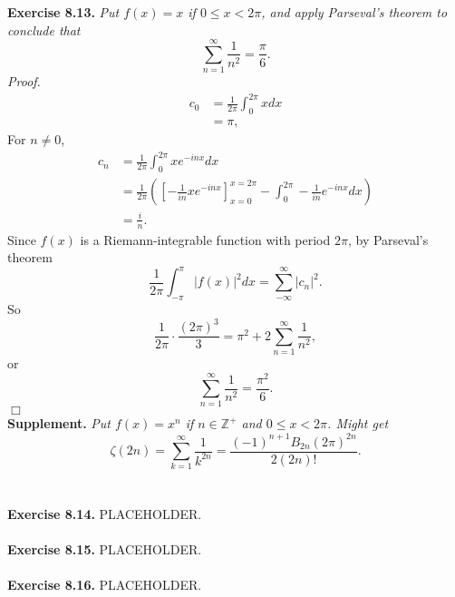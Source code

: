 \documentclass{article}
\begin{document}
\textbf{Exercise 8.13.}
\emph{Put $f(x) = x$ if $0 \leq x < 2 \pi$, and apply Parseval's theorem to conclude that
$$\sum_{n = 1}^{\infty} \frac{1}{n^2} = \frac{\pi}{6}.$$}
\emph{Proof.}
\begin{align*}
c_0
&= \frac{1}{2 \pi} \int_{0}^{2 \pi} x dx \\
&= \pi,
\end{align*}
For $n \neq 0$,
\begin{align*}
c_n
&= \frac{1}{2 \pi} \int_{0}^{2 \pi} x e^{-inx} dx \\
&= \frac{1}{2 \pi} \left(
\left[ - \frac{1}{i n} x e^{-inx} \right]_{x = 0}^{x = 2 \pi}
- \int_{0}^{2 \pi} - \frac{1}{i n} e^{-inx} dx \right) \\
&= \frac{i}{n}.
\end{align*}
Since $f(x)$ is a Riemann-integrable function with period $2 \pi$,
by Parseval's theorem
$$\frac{1}{2 \pi} \int_{-\pi}^\pi |f(x)|^2 dx = \sum_{-\infty}^{\infty} |c_n|^2.$$
So
$$\frac{1}{2 \pi} \cdot \frac{(2 \pi)^3}{3}
= \pi^2 + 2 \sum_{n = 1}^{\infty} \frac{1}{n^2}, $$
or
$$\sum_{n = 1}^{\infty} \frac{1}{n^2}
= \frac{\pi^2}{6}.$$
$\Box$ \\



\textbf{Supplement.} \emph{
Put $f(x) = x^n$ if $n \in \mathbb{Z}^+$ and $0 \leq x < 2 \pi$.
Might get
\[
  \zeta(2n)
  = \sum_{k = 1}^{\infty} \frac{1}{k^{2n}}
  = \frac{(-1)^{n+1} B_{2n} (2\pi)^{2n}}{2(2n)!}.
\]} \\\\






\textbf{Exercise 8.14.}
PLACEHOLDER. \\\\






\textbf{Exercise 8.15.}
PLACEHOLDER. \\\\






\textbf{Exercise 8.16.}
PLACEHOLDER. \\\\
\end{document}
